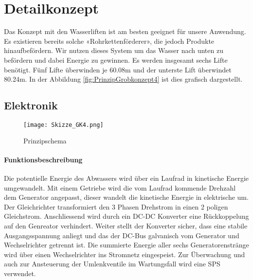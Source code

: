 \section{Detailkonzept} \label{sec:detailkonzept}

Das Konzept mit den Wasserliften ist am besten geeignet für unsere Anwendung. Es existieren bereits solche «Rohrkettenförderer», die jedoch Produkte hinaufbefördern. Wir nutzen dieses System um das Wasser nach unten zu befördern und dabei Energie zu gewinnen. Es werden insgesamt sechs Lifte benötigt. Fünf Lifte überwinden je 60.08\si{m} und der unterste Lift überwindet 80.24\si{m}. In der Abbildung \ref{fig:PrinzipGrobkonzept4}  ist dies grafisch dargestellt.

\subsection{Elektronik}

\begin{figure}[H]
\centering
\texttt{[image: Skizze\_GK4.png]}
\caption{Prinzipschema}
\label{fig:Prinzipschema}
\end{figure}

\paragraph{Funktionsbeschreibung}

Die potentielle Energie des Abwassers wird über ein Laufrad in kinetische Energie umgewandelt. Mit einem Getriebe wird die vom Laufrad kommende Drehzahl dem Generator angepasst, dieser wandelt die kinetische Energie in elektrische um. Der Gleichrichter transformiert den 3 Phasen Drehstrom in einen 2 poligen Gleichstrom. Anschliessend wird durch ein DC-DC Konverter eine Rückkoppelung auf den Genreator verhindert. Weiter stellt der Konverter sicher, dass eine stabile Ausgangsspannung anliegt und das der DC-Bus galvanisch vom Generator und Wechselrichter getrennt ist. Die summierte Energie aller sechs Generatorenstränge wird über einen Wechselrichter ins Stromnetz eingespeist. Zur Überwachung und auch zur Ansteuerung der Umlenkventile im Wartungsfall wird eine SPS verwendet.


